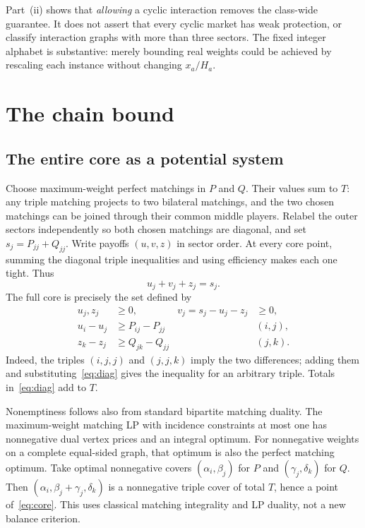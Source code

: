 \documentclass[11pt]{article}
\theoremstyle{remark}\newtheorem{remark}[theorem]{Remark}
\begin{document}
Part~(ii) shows that \emph{allowing} a cyclic interaction removes the
class-wide guarantee. It does not assert that every cyclic market has weak
protection, or classify interaction graphs with more than three sectors.
The fixed integer alphabet is substantive: merely bounding real weights
could be achieved by rescaling each instance without changing $x_a/H_a$.

\section{The chain bound}
\subsection{The entire core as a potential system}
Choose maximum-weight perfect matchings in $P$ and $Q$. Their values sum
to $T$: any triple matching projects to two bilateral matchings, and the
two chosen matchings can be joined through their common middle players.
Relabel the outer sectors independently so both chosen matchings are
diagonal, and set $s_j=P_{jj}+Q_{jj}$. Write payoffs $(u,v,z)$ in sector
order. At every core point, summing the diagonal triple inequalities and
using efficiency makes each one tight. Thus
\begin{equation}\label{eq:diag}
                 u_j+v_j+z_j=s_j.
\end{equation}
The full core is precisely the set defined by
\begin{align}
 u_j,z_j&\geq0, & v_j=s_j-u_j-z_j&\geq0,\label{eq:nonneg}\\
 u_i-u_j&\geq P_{ij}-P_{jj} &&(i,j),\label{eq:U}\\
 z_k-z_j&\geq Q_{jk}-Q_{jj} &&(j,k).\label{eq:Z}
\end{align}
Indeed, the triples $(i,j,j)$ and $(j,j,k)$ imply the two differences;
adding them and substituting~\eqref{eq:diag} gives the inequality for an
arbitrary triple. Totals in~\eqref{eq:diag} add to $T$.

Nonemptiness follows also from standard bipartite matching duality. The
maximum-weight matching LP with incidence constraints at most one has
nonnegative dual vertex prices and an integral optimum. For nonnegative
weights on a complete equal-sided graph, that optimum is also the perfect
matching optimum. Take optimal nonnegative covers $(\alpha_i,\beta_j)$
for $P$ and $(\gamma_j,\delta_k)$ for $Q$. Then
$(\alpha_i,\beta_j+\gamma_j,\delta_k)$ is a nonnegative triple cover
of total $T$, hence a point of~\eqref{eq:core}. This uses classical
matching integrality and LP duality, not a new balance criterion.
\end{document}
